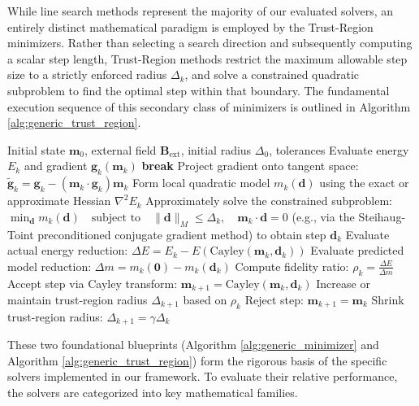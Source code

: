 \documentclass[10pt, a4paper, twocolumn]{article}
\begin{document}
While line search methods represent the majority of our evaluated solvers, an entirely distinct mathematical paradigm is employed by the Trust-Region minimizers. Rather than selecting a search direction and subsequently computing a scalar step length, Trust-Region methods restrict the maximum allowable step size to a strictly enforced radius $\Delta_k$, and solve a constrained quadratic subproblem to find the optimal step within that boundary. The fundamental execution sequence of this secondary class of minimizers is outlined in Algorithm \ref{alg:generic_trust_region}.

\begin{algorithm}[H]
\caption{Generic Preconditioned Trust-Region Minimization}
\label{alg:generic_trust_region}
\begin{algorithmic}[1]
\REQUIRE Initial state $\mathbf{m}_0$, external field $\mathbf{B}_{\mathrm{ext}}$, initial radius $\Delta_0$, tolerances
    \STATE Evaluate energy $E_k$ and gradient $\mathbf{g}_k(\mathbf{m}_k)$ 
        \STATE \textbf{break}
    \ENDIF
    \STATE Project gradient onto tangent space: $\tilde{\mathbf{g}}_k = \mathbf{g}_k - (\mathbf{m}_k \cdot \mathbf{g}_k)\mathbf{m}_k$
    \STATE Form local quadratic model $m_k(\mathbf{d})$ using the exact or approximate Hessian $\nabla^2 E_k$
    \STATE Approximately solve the constrained subproblem: 
           $\min_{\mathbf{d}} m_k(\mathbf{d}) \quad \text{subject to} \quad \|\mathbf{d}\|_{M} \le \Delta_k, \quad \mathbf{m}_k \cdot \mathbf{d} = 0$
           (e.g., via the Steihaug-Toint preconditioned conjugate gradient method) to obtain step $\mathbf{d}_k$
    \STATE Evaluate actual energy reduction: $\Delta E = E_k - E(\mathrm{Cayley}(\mathbf{m}_k, \mathbf{d}_k))$
    \STATE Evaluate predicted model reduction: $\Delta m = m_k(\mathbf{0}) - m_k(\mathbf{d}_k)$
    \STATE Compute fidelity ratio: $\rho_k = \frac{\Delta E}{\Delta m}$
        \STATE Accept step via Cayley transform: $\mathbf{m}_{k+1} = \mathrm{Cayley}(\mathbf{m}_k, \mathbf{d}_k)$
        \STATE Increase or maintain trust-region radius $\Delta_{k+1}$ based on $\rho_k$
    \ELSE
        \STATE Reject step: $\mathbf{m}_{k+1} = \mathbf{m}_k$
        \STATE Shrink trust-region radius: $\Delta_{k+1} = \gamma \Delta_k$
    \ENDIF
\ENDFOR
\end{algorithmic}
\end{algorithm}

These two foundational blueprints (Algorithm \ref{alg:generic_minimizer} and Algorithm \ref{alg:generic_trust_region}) form the rigorous basis of the specific solvers implemented in our framework. To evaluate their relative performance, the solvers are categorized into key mathematical families.
\end{document}
